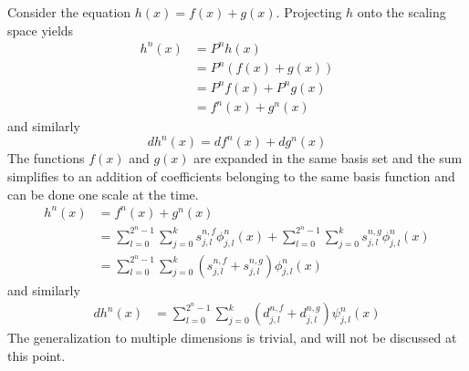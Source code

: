 \noindent
Consider the equation $h(x) = f(x)+g(x)$. Projecting $h$ onto the scaling
space yields
\begin{align}
	\nonumber
	h^n(x)	&= P^nh(x)\\
	\nonumber
			&= P^n\left(f(x)+g(x)\right)\\
	\nonumber
			&= P^nf(x)+P^ng(x)\\
			&= f^n(x)+g^n(x)
	\label{eq:scalingadd}
\end{align}
and similarly
\begin{equation}
	dh^n(x) = df^n(x)+dg^n(x)
	\label{eq:waveletadd}
\end{equation}
The functions $f(x)$ and $g(x)$ are expanded in the same basis set and the
sum simplifies to an addition of coefficients belonging to the same basis
function and can be done one scale at the time.
\begin{align}
	\nonumber
	h^n(x)	&= f^n(x) + g^n(x)\\
	\nonumber
	&= 	\sum_{l=0}^{2^n-1} \sum_{j=0}^k s^{n,f}_{j,l}\phi^n_{j,l}(x) + 
		\sum_{l=0}^{2^n-1}\sum_{j=0}^k s^{n,g}_{j,l}\phi^n_{j,l}(x)\\
	\label{eq:addscaling}
			&= \sum_{l=0}^{2^n-1}\sum_{j=0}^k 
					\left(s^{n,f}_{j,l}+s^{n,g}_{j,l}\right)\phi^n_{j,l}(x)
\end{align}
and similarly
\begin{align}
	\label{eq:addwavelet}
	dh^n(x)	&= \sum_{l=0}^{2^n-1}\sum_{j=0}^k 
					\left(d^{n,f}_{j,l}+d^{n,g}_{j,l}\right)\psi^n_{j,l}(x)
\end{align}
The generalization to multiple dimensions is trivial, and will not be
discussed at this point.

